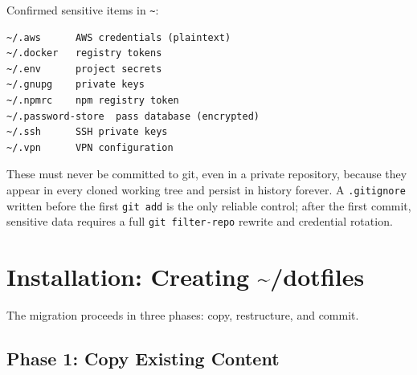 \documentclass[
  11pt,
  letterpaper,
  DIV=11,
  numbers=noendperiod]{scrartcl}
\begin{document}
Confirmed sensitive items in \texttt{\textasciitilde{}}:

\begin{verbatim}
~/.aws      AWS credentials (plaintext)
~/.docker   registry tokens
~/.env      project secrets
~/.gnupg    private keys
~/.npmrc    npm registry token
~/.password-store  pass database (encrypted)
~/.ssh      SSH private keys
~/.vpn      VPN configuration
\end{verbatim}

These must never be committed to git, even in a private repository,
because they appear in every cloned working tree and persist in history
forever. A \texttt{.gitignore} written before the first
\texttt{git\ add} is the only reliable control; after the first commit,
sensitive data requires a full \texttt{git\ filter-repo} rewrite and
credential rotation.

\section{Installation: Creating
\textasciitilde/dotfiles}\label{installation-creating-dotfiles}

The migration proceeds in three phases: copy, restructure, and commit.

\subsection{Phase 1: Copy Existing
Content}\label{phase-1-copy-existing-content}
\end{document}
